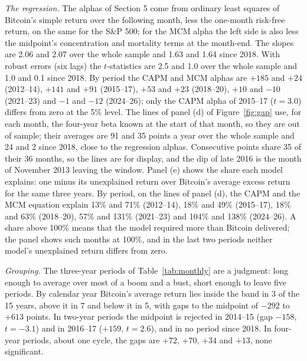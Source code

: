 \documentclass[11pt]{article}
\begin{document}
\emph{The regression.} The alphas of Section 5 come from ordinary least squares of Bitcoin's simple return over the following month, less the one-month risk-free return, on the same for the S\&P 500; for the MCM alpha the left side is also less the midpoint's concentration and mortality terms at the month-end. The slopes are 2.06 and 2.07 over the whole sample and 1.63 and 1.64 since 2018. With robust errors (six lags) the $t$-statistics are 2.5 and 1.0 over the whole sample and 1.0 and 0.1 since 2018. By period the CAPM and MCM alphas are $+185$ and $+24$ (2012--14), $+141$ and $+91$ (2015--17), $+53$ and $+23$ (2018--20), $+10$ and $-10$ (2021--23) and $-1$ and $-12$ (2024--26); only the CAPM alpha of 2015--17 ($t = 3.0$) differs from zero at the 5\% level. The lines of panel (d) of Figure~\ref{fig:gap} use, for each month, the four-year beta known at the start of that month, so they are out of sample; their averages are 91 and 35 points a year over the whole sample and 24 and 2 since 2018, close to the regression alphas. Consecutive points share 35 of their 36 months, so the lines are for display, and the dip of late 2016 is the month of November 2013 leaving the window. Panel (e) shows the share each model explains: one minus its unexplained return over Bitcoin's average excess return for the same three years. By period, on the lines of panel (d), the CAPM and the MCM equation explain 13\% and 71\% (2012--14), 18\% and 49\% (2015--17), 18\% and 63\% (2018--20), 57\% and 131\% (2021--23) and 104\% and 138\% (2024--26). A share above 100\% means that the model required more than Bitcoin delivered; the panel shows such months at 100\%, and in the last two periods neither model's unexplained return differs from zero.

\emph{Grouping.} The three-year periods of Table~\ref{tab:monthly} are a judgment: long enough to average over most of a boom and a bust, short enough to leave five periods. By calendar year Bitcoin's average return lies inside the band in 3 of the 15 years, above it in 7 and below it in 5, with gaps to the midpoint of $-292$ to $+613$ points. In two-year periods the midpoint is rejected in 2014--15 (gap $-158$, $t = -3.1$) and in 2016--17 ($+159$, $t = 2.6$), and in no period since 2018. In four-year periods, about one cycle, the gaps are $+72$, $+70$, $+34$ and $+13$, none significant.
\end{document}
